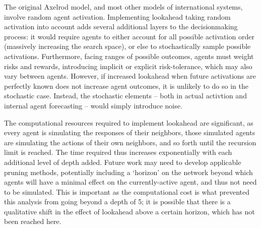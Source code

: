 \documentclass{article}
\begin{document}
The original Axelrod model, and most other models of international systems, involve random agent activation. Implementing lookahead taking random activation into account adds several additional layers to the decisionmaking process: it would require agents to either account for all possible activation order (massively increasing the search space), or else to stochastically sample possible activations. Furthermore, facing ranges of possible outcomes, agents must weight risks and rewards, introducing implicit or explicit risk-tolerance, which may also vary between agents. However, if increased lookahead when future activations are perfectly known does not increase agent outcomes, it is unlikely to do so in the stochastic case. Instead, the stochastic elements -- both in actual activtion and internal agent forecasting -- would simply introduce noise. 

The computational resources required to implement lookahead are significant, as every agent is simulating the responses of their neighbors, those simulated agents are simulating the actions of their own neighbors, and so forth until the recursion limit is reached. The time required thus increases exponentially with each additional level of depth added. Future work may need to develop applicable pruning methods, potentially including a `horizon' on the network beyond which agents will have a minimal effect on the currently-active agent, and thus not need to be simulated. This is important as the computational cost is what prevented this analysis from going beyond a depth of 5; it is possible that there is a qualitative shift in the effect of lookahead above a certain horizon, which has not been reached here.



\end{document}
